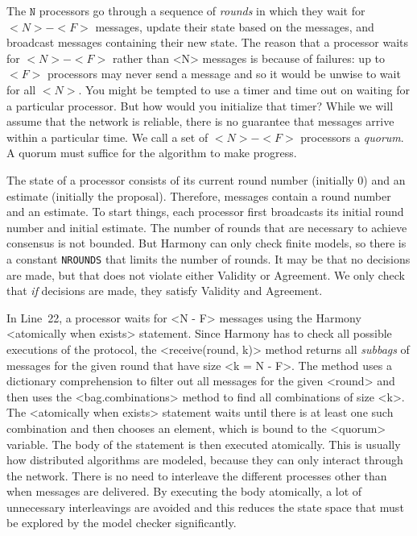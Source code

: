 \documentclass{report}
\begin{document}
The $\mathtt{N}$ processors go through a sequence of \emph{rounds} in which they wait for
$<{N}> - <{F}>$ messages, update their state based on the messages, and
broadcast messages containing their new state.
The reason that a processor waits for $<{N}> - <{F}>$ rather than <{N}>
messages is because of failures: up to $<{F}>$ processors may never send a message
and so it would be unwise to wait for all $<{N}>$.  You might be tempted to use
a timer and time out on waiting for a particular processor.  But how would you initialize
that timer?  While we will assume that the network is reliable, there is no guarantee
that messages arrive within a particular time.
We call a set of $<{N}> - <{F}>$ processors a \emph{quorum}.
A quorum must suffice for the algorithm to make progress.

The state of a processor consists of its current round number (initially 0)
and an estimate (initially the proposal).  Therefore, messages contain
a round number and an estimate. To start things, each processor first
broadcasts its initial round number and initial estimate.
The number of rounds that are necessary to achieve consensus is not bounded.  But
Harmony can only check finite models, so there is a constant \texttt{NROUNDS} that
limits the number of rounds.  It may be that no decisions are made, but that does not
violate either Validity or Agreement.  We only check that \emph{if} decisions are
made, they satisfy Validity and Agreement.

In Line~22, a processor waits for <{N - F}> messages using
the Harmony <{atomically when exists}> statement.
Since Harmony has to check all possible executions of the protocol, the
<{receive(round, k)}> method returns all \emph{subbags} of messages
for the given round that have size <{k = N - F}>.  The method uses a
dictionary comprehension to filter out all messages for the given <{round}>
and then uses the <{bag.combinations}> method to find all combinations of size <{k}>.
The <{atomically when exists}> statement waits until there is at least one such combination and
then chooses an element, which is bound to the <{quorum}> variable.
The body of the statement is then executed atomically.
This is usually how distributed algorithms are modeled, because they can only interact
through the network.  There is no need to interleave the different processes other
than when messages are delivered.  By executing the body atomically, a lot of
unnecessary interleavings are avoided and this reduces the state space that must
be explored by the model checker significantly.
\end{document}
